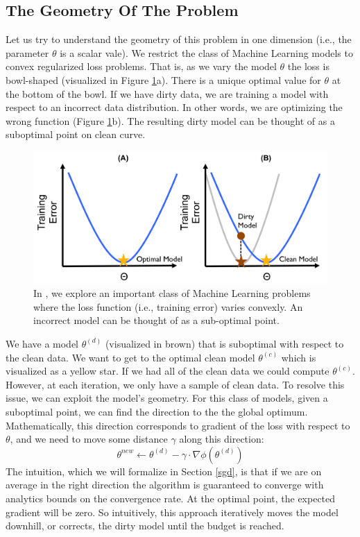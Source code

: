 \subsection{The Geometry Of The Problem}
Let us try to understand the geometry of this problem in one dimension (i.e., the parameter $\theta$ is a scalar vale).
We restrict the class of Machine Learning models to convex regularized loss problems.
That is, as we vary the model $\theta$ the loss is bowl-shaped (visualized in Figure \ref{update-arch2}a).
There is a unique optimal value for $\theta$ at the bottom of the bowl.
If we have dirty data, we are training a model with respect to an incorrect data distribution.
In other words, we are optimizing the wrong function (Figure \ref{update-arch2}b).
The resulting dirty model can be thought of as a suboptimal point on clean curve.

\begin{figure}[ht!]
\centering
 \includegraphics[width=\columnwidth]{figs/update-arch2.png}
 \caption{In \sys, we explore an important class of Machine Learning problems where the loss function (i.e., training error) varies convexly. An incorrect model can be thought of as a sub-optimal point. \label{update-arch2}}
\end{figure}

We have a model $\theta^{(d)}$ (visualized in brown) that is suboptimal with respect to the clean data.
We want to get to the optimal clean model $\theta^{(c)}$ which is visualized as a yellow star.
If we had all of the clean data we could compute $\theta^{(c)}$.
However, at each iteration, we only have a sample of clean data.
To resolve this issue, we can exploit the model's geometry.
For this class of models, given a suboptimal point, we can find the direction to the 
the global optimum.
Mathematically, this direction corresponds to gradient of the loss with respect to $\theta$, and we need to move some distance $\gamma$ along this direction:
\[
\theta^{new} \leftarrow \theta^{(d)} - \gamma \cdot \nabla\phi(\theta^{(d)})
\]
The intuition, which we will formalize in Section \ref{sgd}, is that if we are on average in the right direction the algorithm is guaranteed to converge with analytics bounds on the convergence rate.
At the optimal point, the expected gradient will be zero.
So intuitively, this approach iteratively moves the model downhill, or corrects, the dirty model until the budget is reached.


